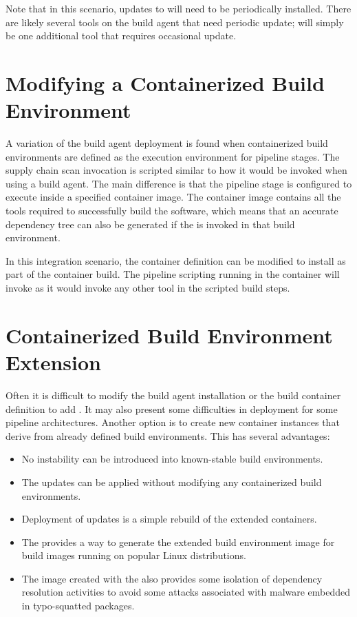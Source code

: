 Note that in this scenario, updates to \scaresolver will need to be
periodically installed.  There are likely several tools on the build agent
that need periodic update; \scaresolver will simply be one additional
tool that requires occasional update.

\section{Modifying a Containerized Build Environment}

A variation of the build agent deployment is found when containerized
build environments are defined as the execution environment for
pipeline stages.  The supply chain scan invocation is scripted similar
to how it would be invoked when using a build agent.  The main difference
is that the pipeline stage is configured to execute inside a specified
container image.  The container image contains all the tools required
to successfully build the software, which means that an accurate
dependency tree can also be generated if the \scaresolver is invoked
in that build environment.

In this integration scenario, the container definition can be modified to install \scaresolver
as part of the container build.  The pipeline scripting running in the container
will invoke \scaresolver as it would invoke any other tool in the scripted
build steps.  

\section{Containerized Build Environment Extension}\label{sec:extending_environment}

Often it is difficult to modify the build agent installation or the build
container definition to add \scaresolver.  It may also present some
difficulties in deployment for some pipeline architectures.  Another option
is to create new container instances that derive from already defined build
environments.  This has several advantages:

\begin{itemize}
    \item No instability can be introduced into known-stable build environments.
    \item The \scaresolver updates can be applied without modifying any 
    containerized build environments.
    \item Deployment of updates is a simple rebuild of the extended containers.
    \item The \cxtoolkit provides a way to generate the extended build 
    environment image for build images running on popular Linux distributions.
    \item The image created with the \cxtoolkit also provides some isolation of 
    dependency resolution activities to avoid some attacks associated with 
    malware embedded in typo-squatted packages.
\end{itemize}

